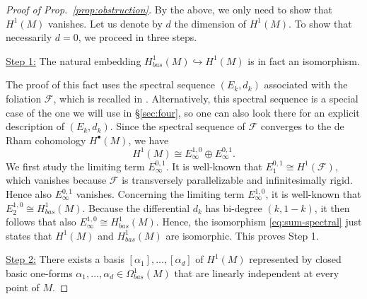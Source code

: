 \documentclass[11pt, letterpaper, oneside,reqno]{amsart}
\theoremstyle{plain}
\theoremstyle{underline}
\theoremstyle{definition}
\theoremstyle{remark}
\begin{document}
	\begin{proof}[Proof of Prop.~\ref{prop:obstruction}]
By the above, we only need to show that $H^{1}(M)$ vanishes. Let us denote by $d$ the dimension of $H^{1}(M)$. To show that necessarily $d=0$, we proceed in three steps.

\vspace{0.2cm}
\noindent
\underline{Step 1:} The natural embedding $H^{1}_{bas}(M)\hookrightarrow H^{1}(M)$ is in fact an isomorphism.

\vspace{0.1cm}
The proof of this fact uses the spectral sequence $(E_k,d_k)$ associated with the foliation $\mathcal{F}$, which is recalled in \cite[Chapter 4]{Tondeur}. Alternatively, this spectral sequence is a special case of the one we will use in \S\ref{sec:four}, so one can also look there for an explicit description of $(E_k,d_k)$.  Since the spectral sequence of $\mathcal{F}$ converges to the de Rham cohomology $H^{\bullet}(M)$, we have 
\begin{equation}\label{eq:sum-spectral}
H^{1}(M)\cong E^{1,0}_{\infty}\oplus E^{0,1}_{\infty}.
\end{equation}
We first study the limiting term $E^{0,1}_{\infty}$. It is well-known that $E^{0,1}_{1}\cong H^{1}(\mathcal{F})$, which vanishes because $\mathcal{F}$ is transversely parallelizable and infinitesimally rigid. Hence also $E^{0,1}_{\infty}$ vanishes. Concerning the limiting term $E^{1,0}_{\infty}$, it is well-known that $E^{1,0}_{2}\cong H^{1}_{bas}(M)$. Because the differential $d_k$ has bi-degree $(k,1-k)$, it then follows that also $E^{1,0}_{\infty}\cong H^{1}_{bas}(M)$. Hence, the isomorphism \eqref{eq:sum-spectral} just states that $H^{1}(M)$ and $H^{1}_{bas}(M)$ are isomorphic. This proves Step 1. 
	
\vspace{0.2cm}
\noindent
\underline{Step 2:} There exists a basis $[\alpha_1],\ldots,[\alpha_d]$ of $H^{1}(M)$ represented by closed basic one-forms $\alpha_1,\ldots,\alpha_{d}\in\Omega^{1}_{bas}(M)$ that are linearly independent at every point of $M$. 


\end{proof}
\end{document}
